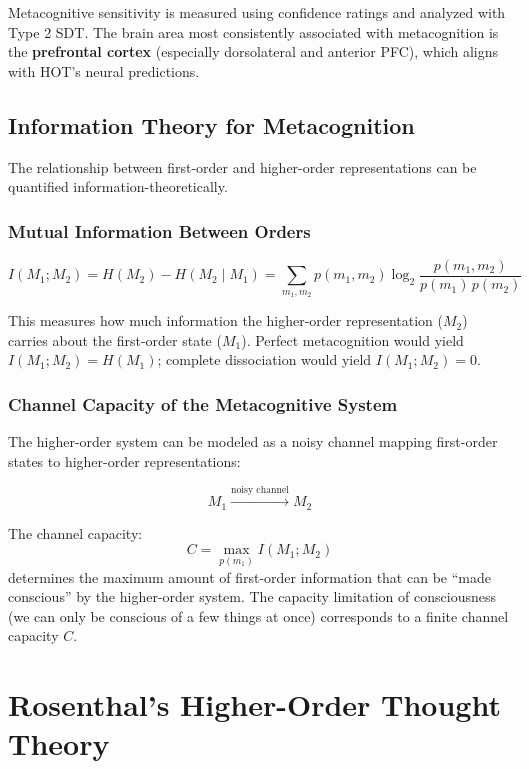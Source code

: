 \documentclass[11pt,a4paper]{report}
\begin{document}
Metacognitive sensitivity is measured using confidence ratings and analyzed with Type 2 SDT. The brain area most consistently associated with metacognition is the \textbf{prefrontal cortex} (especially dorsolateral and anterior PFC), which aligns with HOT's neural predictions.

\section{Information Theory for Metacognition}

The relationship between first-order and higher-order representations can be quantified information-theoretically.

\subsection{Mutual Information Between Orders}

\begin{mathbox}
\vspace{-8pt}
\[
  I(M_1; M_2) = H(M_2) - H(M_2 \mid M_1) = \sum_{m_1, m_2} p(m_1, m_2) \log_2 \frac{p(m_1, m_2)}{p(m_1)\, p(m_2)}
\]
\vspace{-10pt}
\end{mathbox}

This measures how much information the higher-order representation ($M_2$) carries about the first-order state ($M_1$). Perfect metacognition would yield $I(M_1; M_2) = H(M_1)$; complete dissociation would yield $I(M_1; M_2) = 0$.

\subsection{Channel Capacity of the Metacognitive System}

The higher-order system can be modeled as a noisy channel mapping first-order states to higher-order representations:

\[
  M_1 \xrightarrow{\text{noisy channel}} M_2
\]

The channel capacity:
\[
  C = \max_{p(m_1)} I(M_1; M_2)
\]
determines the maximum amount of first-order information that can be ``made conscious'' by the higher-order system. The capacity limitation of consciousness (we can only be conscious of a few things at once) corresponds to a finite channel capacity $C$.


\chapter{Rosenthal's Higher-Order Thought Theory}
\end{document}

